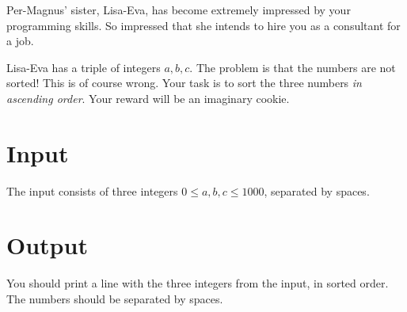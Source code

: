 
Per-Magnus' sister, Lisa-Eva, has become extremely impressed by your programming skills.
So impressed that she intends to hire you as a consultant for a job.

Lisa-Eva has a triple of integers $a, b, c$.
The problem is that the numbers are not sorted!
This is of course wrong.
Your task is to sort the three numbers \emph{in ascending order}.
Your reward will be an imaginary cookie.

\section*{Input}
The input consists of three integers $0 \le a, b, c \le 1000$, separated by spaces.

\section*{Output}
You should print a line with the three integers from the input, in sorted order. The numbers should be separated by spaces.
